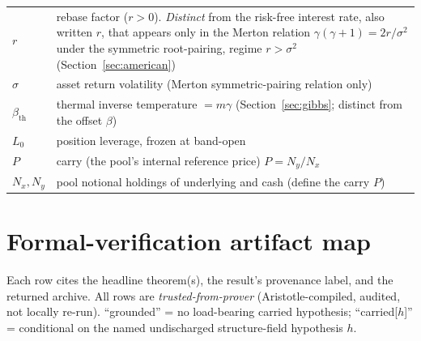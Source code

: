 \documentclass[11pt]{article}
\newcommand{\tfp}{\emph{trusted-from-prover}}
\begin{document}
\begin{center}
\begin{tabular}{ll}
$r$ & rebase factor ($r>0$). \emph{Distinct} from the risk-free interest rate, also written $r$, that appears only in the Merton relation $\gamma(\gamma+1)=2r/\sigma^{2}$ under the symmetric root-pairing, regime $r>\sigma^{2}$ (Section~\ref{sec:american}) \\
$\sigma$ & asset return volatility (Merton symmetric-pairing relation only) \\
$\beta_{\mathrm{th}}$ & thermal inverse temperature $=m\gamma$ (Section~\ref{sec:gibbs}; distinct from the offset $\beta$) \\
$L_{0}$ & position leverage, frozen at band-open \\
$P$ & carry (the pool's internal reference price) $P=N_{y}/N_{x}$ \\
$N_{x},N_{y}$ & pool notional holdings of underlying and cash (define the carry $P$) \\
\bottomrule
\end{tabular}
\end{center}

\section{Formal-verification artifact map}\label{app:formal}

Each row cites the headline theorem(s), the result's provenance label, and the
returned archive. All rows are \tfp{} (Aristotle-compiled, audited, not locally
re-run). ``grounded'' = no load-bearing carried hypothesis; ``carried[$h$]'' =
conditional on the named undischarged structure-field hypothesis $h$.
\end{document}
